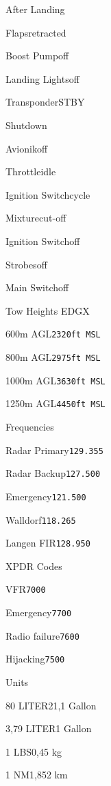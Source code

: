 \begin{checklist}{After Landing}
  \item{Flaps}{retracted}
  \item{Boost Pump}{off}
  \item{Landing Lights}{off}
  \item{Transponder}{STBY}
\end{checklist}

\begin{checklist}{Shutdown}
  \item{Avionik}{off}
  \item{Throttle}{idle}
  \item{Ignition Switch}{cycle}
  \item{Mixture}{cut-off}
  \item{Ignition Switch}{off}
  \item{Strobes}{off}
  \item{Main Switch}{off}
\end{checklist}

\begin{checklist}{Tow Heights EDGX}
  \item{600m AGL}{\texttt{2320ft MSL}}
  \item{800m AGL}{\texttt{2975ft MSL}}
  \item{1000m AGL}{\texttt{3630ft MSL}}
  \item{1250m AGL}{\texttt{4450ft MSL}}
\end{checklist}

\begin{checklist}{Frequencies}
  \item{Radar Primary}{\texttt{129.355}}
  \item{Radar Backup}{\texttt{127.500}}
  \item{Emergency}{\texttt{121.500}}
  \item{Walldorf}{\texttt{118.265}}
  \item{Langen FIR}{\texttt{128.950}}
\end{checklist}

\begin{checklist}{XPDR Codes}
  \item{VFR}{\texttt{7000}}
  \item{Emergency}{\texttt{7700}}
  \item{Radio failure}{\texttt{7600}}
  \item{Hijacking}{\texttt{7500}}
\end{checklist}

\begin{checklist}{Units}
  \item{80 LITER}{21,1 Gallon}
  \item{3,79 LITER}{1 Gallon}
  \item{1 LBS}{0,45 kg}
  \item{1 NM}{1,852 km}

\end{checklist}

